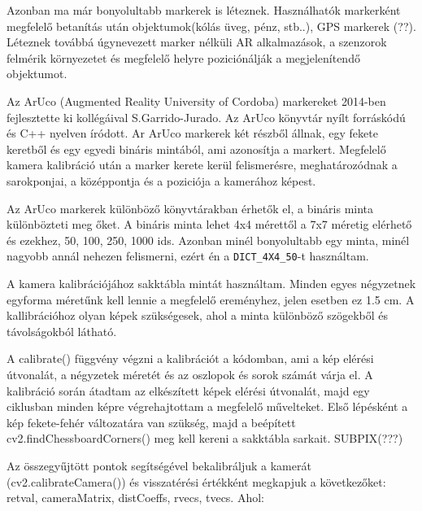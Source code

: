 Azonban ma már bonyolultabb markerek is léteznek. Használhatók markerként megfelelő betanítás után objektumok(kólás üveg, pénz, stb..), GPS markerek (??).
Léteznek továbbá úgynevezett marker nélküli AR alkalmazások, a szenzorok felmérik környezetet és megfelelő helyre poziciónálják a megjelenítendő objektumot.





Az ArUco (Augmented Reality University of Cordoba) markereket 2014-ben fejlesztette ki kollégáival S.Garrido-Jurado. 
Az ArUco könyvtár nyílt forráskódú és C++ nyelven íródott. 
Ar ArUco markerek két részből állnak, egy fekete keretből és egy egyedi bináris mintából, ami azonosítja a markert.
Megfelelő kamera kalibráció után a marker kerete kerül felismerésre, meghatározódnak a sarokponjai, a középpontja és a poziciója a kamerához képest.


Az ArUco markerek különböző könyvtárakban érhetők el, a bináris minta különbözteti meg őket. A bináris minta lehet 4x4 mérettől a 7x7 méretig elérhető és ezekhez, 50, 100, 250, 1000 ids. Azonban minél bonyolultabb egy minta, minél nagyobb annál nehezen felismerni, ezért én a  \texttt{DICT\_4X4\_50}-t használtam.


A kamera kalibrációjához sakktábla mintát használtam. Minden egyes négyzetnek egyforma méretűnk kell lennie a megfelelő ereményhez, jelen esetben ez 1.5 cm. 
A kallibrációhoz olyan képek szükségesek, ahol a minta különböző szögekből és távolságokból látható.

A calibrate() függvény végzni a kalibrációt a kódomban, ami a kép elérési útvonalát, a négyzetek méretét és az oszlopok és sorok számát várja el. A kalibráció során átadtam az elkészített képek elérési útvonalát, majd egy ciklusban minden képre végrehajtottam a megfelelő művelteket.
Első lépésként a kép fekete-fehér változatára van szükség, majd a beépített cv2.findChessboardCorners() meg kell kereni a sakktábla sarkait.
SUBPIX(???)

Az összegyűjtött pontok segítségével bekalibráljuk a kamerát (cv2.calibrateCamera()) és visszatérési értékként megkapjuk a következőket:
retval, cameraMatrix, distCoeffs, rvecs, tvecs. Ahol:

